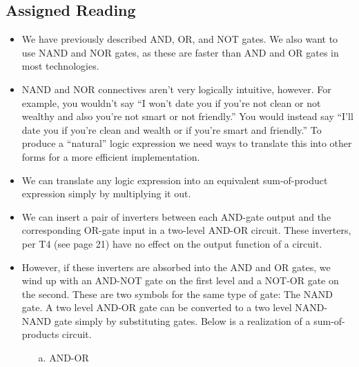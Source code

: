 \documentclass[10pt,a4paper]{article}
\begin{document}
\subsection{Assigned Reading}
\begin{itemize}
\item We have previously described AND, OR, and NOT gates. We also want to use NAND and NOR gates, as these are faster than AND and OR gates in most technologies. 
\item NAND and NOR connectives aren't very logically intuitive, however. For example, you wouldn't say ``I won't date you if you're not clean or not wealthy and also you're not smart or not friendly.'' You would instead say ``I'll date you if you're clean and wealth or if you're smart and friendly.'' To produce a ``natural'' logic expression we need ways to translate this into other forms for a more efficient implementation. 
\item We can translate any logic expression into an equivalent sum-of-product expression simply by multiplying it out. 
\item We can insert a pair of inverters between each AND-gate output and the corresponding OR-gate input in a two-level AND-OR circuit. These inverters, per T4 (see page 21) have no effect on the output function of a circuit. 
\item However, if these inverters are absorbed into the AND and OR gates, we wind up with an AND-NOT gate on the first level and a NOT-OR gate on the second. These are two symbols for the same type of gate: The NAND gate. A two level AND-OR gate can be converted to a two level NAND-NAND gate simply by substituting gates. Below is a realization of a sum-of-products circuit.
\begin{enumerate}
\item [a.] AND-OR\\
\end{enumerate}
\end{itemize}
\end{document}
